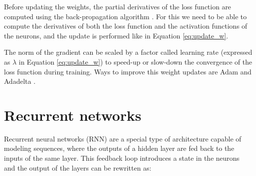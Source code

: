 Before updating the weights, the partial derivatives of the loss function are computed using the back-propagation algorithm \cite{chauvin1995backpropagation}. For this we need to be able to compute the derivatives of both the loss function and the activation functions of the neurons, and the update is performed like in Equation \ref{eq:update_w}.

The norm of the gradient can be scaled by a factor called learning rate (expressed as $\lambda$ in Equation \ref{eq:update_w}) to speed-up or slow-down the convergence of the loss function during training. Ways to improve this weight updates are Adam \cite{kingma2014adam} and Adadelta \cite{zeiler2012adadelta}.




\section{Recurrent networks}

Recurrent neural networks (RNN) are a special type of architecture capable of modeling sequences, where the outputs of a hidden layer are fed back to the inputs of the same layer. This feedback loop introduces a state in the neurons and the output of the layers can be rewritten as:

